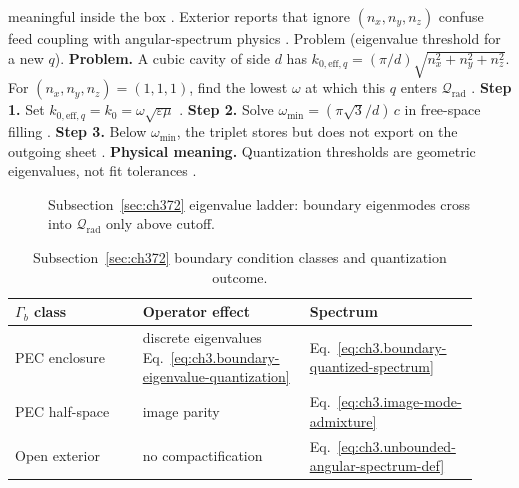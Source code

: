 meaningful inside the box \cite{stratton1941}. Exterior reports that ignore \((n_{x},n_{y},n_{z})\) confuse feed coupling with
angular-spectrum physics \cite{harrington2001}.
Problem (eigenvalue threshold for a new \(q\)). \textbf{Problem.} A cubic cavity of side \(d\) has \(k_{0,\mathrm{eff},q}=(\pi/d)\sqrt{n_{x}^{2}+n_{y}^{2}+n_{z}^{2}}\). For
\((n_{x},n_{y},n_{z})=(1,1,1)\), find the lowest \(\omega\) at which this \(q\) enters \(\mathcal{Q}_{\mathrm{rad}}\)
\cite{jackson1999}.
\textbf{Step 1.} Set \(k_{0,\mathrm{eff},q}=k_{0}=\omega\sqrt{\varepsilon\mu}\) \cite{jackson1999}.
\textbf{Step 2.} Solve \(\omega_{\min}=(\pi\sqrt{3}/d)\,c\) in free-space filling \cite{stratton1941}.
\textbf{Step 3.} Below \(\omega_{\min}\), the triplet stores but does not export on the outgoing sheet \cite{harrington2001}.
\textbf{Physical meaning.} Quantization thresholds are geometric eigenvalues, not fit tolerances \cite{hansen1988}.
\begin{figure}[t]
\centering
{}
\caption{Subsection~\ref{sec:ch372} eigenvalue ladder: boundary eigenmodes cross into \(\mathcal{Q}_{\mathrm{rad}}\) only above cutoff.}
\label{fig:ch3.372-eigenvalue-ladder}
\end{figure}
\begin{table}[t]
\centering
\caption{Subsection~\ref{sec:ch372} boundary condition classes and quantization outcome.}
\label{tab:ch3.372-bc-quantization}
\small
\begin{tabular}{@{}p{0.26\linewidth}p{0.34\linewidth}p{0.32\linewidth}@{}}
\toprule
\(\Gamma_{b}\) class & Operator effect & Spectrum \\
\midrule
PEC enclosure & discrete eigenvalues Eq.~\eqref{eq:ch3.boundary-eigenvalue-quantization} & Eq.~\eqref{eq:ch3.boundary-quantized-spectrum} \\
PEC half-space & image parity & Eq.~\eqref{eq:ch3.image-mode-admixture} \\
Open exterior & no compactification & Eq.~\eqref{eq:ch3.unbounded-angular-spectrum-def} \\
\bottomrule
\end{tabular}
\end{table}
